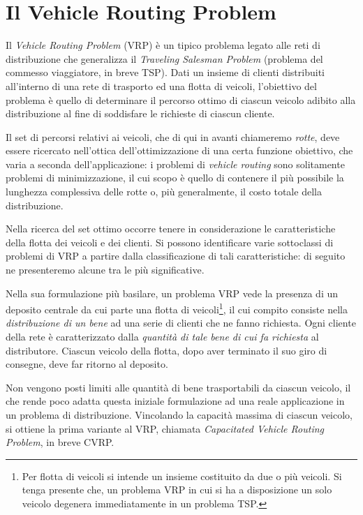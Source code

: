 \chapter{Il Vehicle Routing Problem}\label{ch:vrp}

Il \emph{Vehicle Routing Problem} (VRP) è un tipico problema legato alle reti di distribuzione che generalizza il \emph{Traveling Salesman Problem} (problema del commesso viaggiatore, in breve TSP). Dati un insieme di clienti distribuiti all’interno di una rete di trasporto ed una flotta di veicoli, l’obiettivo del problema è quello di determinare il percorso ottimo di ciascun veicolo adibito alla distribuzione al fine di soddisfare le richieste di ciascun cliente.

Il set di percorsi relativi ai veicoli, che di qui in avanti chiameremo \emph{rotte}, deve essere ricercato nell’ottica dell’ottimizzazione di una certa funzione obiettivo, che varia a seconda dell’applicazione: i problemi di \emph{vehicle routing} sono solitamente problemi di minimizzazione, il cui scopo è quello di contenere il più possibile la lunghezza complessiva delle rotte o, più generalmente, il costo totale della distribuzione.

Nella ricerca del set ottimo occorre tenere in considerazione le caratteristiche della flotta dei veicoli e dei clienti. Si possono identificare varie sottoclassi di problemi di VRP a partire dalla classificazione di tali caratteristiche: di seguito ne presenteremo alcune tra le più significative.

Nella sua formulazione più basilare, un problema VRP vede la presenza di un deposito centrale da cui parte una flotta di veicoli\footnote{Per flotta di veicoli si intende un insieme costituito da due o più veicoli. Si tenga presente che, un problema VRP in cui si ha a disposizione un solo veicolo degenera immediatamente in un problema TSP.}, il cui compito consiste nella \emph{distribuzione di un bene} ad una serie di clienti che ne fanno richiesta. Ogni cliente della rete è caratterizzato dalla \emph{quantità di tale bene di cui fa richiesta} al distributore. Ciascun veicolo della flotta, dopo aver terminato il suo giro di consegne, deve far ritorno al deposito.

Non vengono posti limiti alle quantità di bene trasportabili da ciascun veicolo, il che rende poco adatta questa iniziale formulazione ad una reale applicazione in un problema di distribuzione. Vincolando la capacità massima di ciascun veicolo, si ottiene la prima variante al VRP, chiamata \emph{Capacitated Vehicle Routing Problem}, in breve CVRP.

